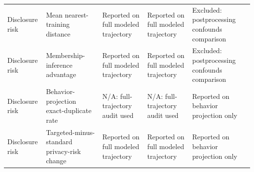 \begin{longtable}{@{}p{2.8cm}p{5.2cm}p{4.65cm}p{4.65cm}p{4.65cm}@{}}
Disclosure risk & Mean nearest-training distance & Reported on full modeled trajectory & Reported on full modeled trajectory & Excluded: postprocessing confounds comparison \\
Disclosure risk & Membership-inference advantage & Reported on full modeled trajectory & Reported on full modeled trajectory & Excluded: postprocessing confounds comparison \\
Disclosure risk & Behavior-projection exact-duplicate rate & N/A: full-trajectory audit used & N/A: full-trajectory audit used & Reported on behavior projection only \\
Disclosure risk & Targeted-minus-standard privacy-risk change & Reported on full modeled trajectory & Reported on full modeled trajectory & Reported on behavior projection only \\
\end{longtable}
